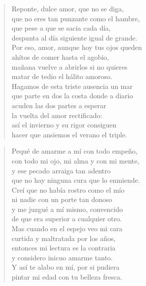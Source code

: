 \documentclass[12pt]{article}
\begin{document}
\clearpage
{}
\begin{verse}

Reponte, dulce amor, que no se diga,\\
que no eres tan punzante como el hambre,\\
que pese a que se sacia cada día,\\
despunta al día siguiente igual de grande.\\
Por eso, amor, aunque hoy tus ojos queden\\
ahítos de comer hasta el agobio,\\
mañana vuelve a abrirlos si no quieres\\
matar de tedio el hálito amoroso.\\
Hagamos de esta triste ausencia un mar\\
que parte en dos la costa donde a diario\\
acuden las dos partes a esperar\\
la vuelta del amor rectificado:\\
así el invierno y su rigor consiguen\\
hacer que ansiemos el verano el triple.

\end{verse}

\clearpage
{}
\begin{verse}

Pequé de amarme a mí con todo empeño,\\
con todo mi ojo, mi alma y con mi mente,\\
y ese pecado arraiga tan adentro\\
que no hay ninguna cura que lo enmiende.\\
Creí que no había rostro como el mío\\
ni nadie con un porte tan donoso\\
y me juzgué a mí mismo, convencido\\
de que era superior a cualquier otro.\\
Mas cuando en el espejo veo mi cara\\
curtida y maltratada por los años,\\
entonces mi lectura es la contraria\\
y considero inicuo amarme tanto.\\
Y así te alabo en mí, por si pudiera\\
pintar mi edad con tu belleza fresca.

\end{verse}
\end{document}

